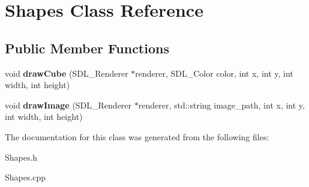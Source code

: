 \hypertarget{class_shapes}{}\section{Shapes Class Reference}
\label{class_shapes}
\subsection*{Public Member Functions}
\begin{DoxyCompactItemize}
\item 
\mbox{\label{class_shapes_a41446c1a0c182d70d001578d9138ea67}} 
void {\bfseries draw\+Cube} (S\+D\+L\+\_\+\+Renderer $\ast$renderer, S\+D\+L\+\_\+\+Color color, int x, int y, int width, int height)
\item 
\mbox{\label{class_shapes_adc68944bdd25e3fb6726fc2d23b81e3c}} 
void {\bfseries draw\+Image} (S\+D\+L\+\_\+\+Renderer $\ast$renderer, std\+::string image\+\_\+path, int x, int y, int width, int height)
\end{DoxyCompactItemize}


The documentation for this class was generated from the following files\+:\begin{DoxyCompactItemize}
\item 
Shapes.\+h\item 
Shapes.\+cpp\end{DoxyCompactItemize}
